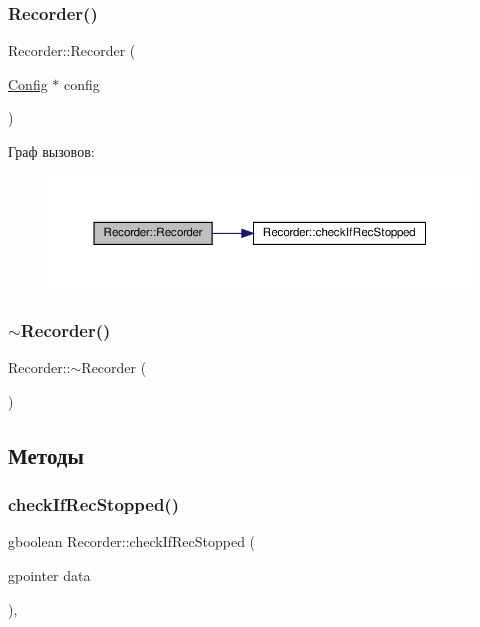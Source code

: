 \subsubsection{\texorpdfstring{Recorder()}{Recorder()}}
{\footnotesize\ttfamily Recorder\+::\+Recorder (\begin{DoxyParamCaption}\item[{\hyperlink{class_config}{Config} $\ast$}]{config }\end{DoxyParamCaption})}

Граф вызовов\+:\nopagebreak
\begin{figure}[H]
\begin{center}
\leavevmode
\includegraphics[width=350pt]{class_recorder_aa3cf7e6df22a7a21e8939e1dc1d02ea1_cgraph}
\end{center}
\end{figure}
\mbox{\label{class_recorder_a6b3c569577fcdc298d8d4a6a2b96e9a9}} 
\subsubsection{\texorpdfstring{$\sim$\+Recorder()}{~Recorder()}}
{\footnotesize\ttfamily Recorder\+::$\sim$\+Recorder (\begin{DoxyParamCaption}{ }\end{DoxyParamCaption})}



\subsection{Методы}
\mbox{\label{class_recorder_a1fdebd3d390713fcafe6c76635760841}} 
\subsubsection{\texorpdfstring{check\+If\+Rec\+Stopped()}{checkIfRecStopped()}}
{\footnotesize\ttfamily gboolean Recorder\+::check\+If\+Rec\+Stopped (\begin{DoxyParamCaption}\item[{gpointer}]{data }\end{DoxyParamCaption})\hspace{0.3cm}{\ttfamily [static]}, {\ttfamily [private]}}


